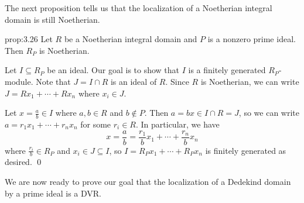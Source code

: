The next proposition tells us that the localization of a Noetherian integral domain
is still Noetherian. 

\begin{prop}{prop:3.26}
    Let $R$ be a Noetherian integral domain and $P$ is a nonzero prime ideal. 
    Then $R_P$ is Noetherian. 
\end{prop}\newpage
\begin{pf}
    Let $I \subseteq R_P$ be an ideal. Our goal is to show that 
    $I$ is a finitely generated $R_P$-module. Note that 
    $J = I \cap R$ is an ideal of $R$. Since $R$ is Noetherian, we can 
    write $J = Rx_1 + \cdots + Rx_n$ where $x_i \in J$. 
    
    Let $x = \frac{a}{b} \in I$ where $a, b \in R$ and $b \notin P$. Then 
    $a = bx \in I \cap R = J$, so we can write 
    $a = r_1 x_1 + \cdots + r_n x_n$ for some $r_i \in R$. In particular, 
    we have 
    \[ x = \frac{a}{b} = \frac{r_1}{b} x_1 + \cdots + \frac{r_n}{b} x_n \] 
    where $\frac{r_i}{b} \in R_P$ and $x_i \in J \subseteq I$, so 
    $I = R_P x_1 + \cdots + R_P x_n$ is finitely generated as desired. \qed
\end{pf}\vspace{-0.25cm}

We are now ready to prove our goal that the localization of a Dedekind 
domain by a prime ideal is a DVR. 

